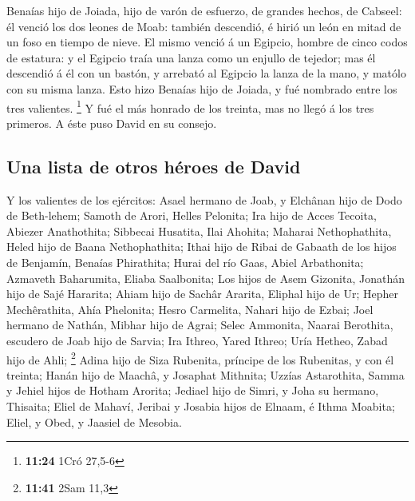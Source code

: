  Benaías hijo de Joiada, hijo de varón de esfuerzo, de
grandes hechos, de Cabseel: él venció los dos leones de Moab: también
descendió, é hirió un león en mitad de un foso en tiempo de nieve.
 El mismo venció á un Egipcio, hombre de cinco codos de
estatura: y el Egipcio traía una lanza como un enjullo de tejedor; mas
él descendió á él con un bastón, y arrebató al Egipcio la lanza de la
mano, y matólo con su misma lanza.  Esto hizo Benaías
hijo de Joiada, y fué nombrado entre los tres valientes. \footnote{\textbf{11:24}
  1Cró 27,5-6}  Y fué el más honrado de los treinta, mas
no llegó á los tres primeros. A éste puso David en su consejo.

\hypertarget{una-lista-de-otros-huxe9roes-de-david}{%
\subsection{Una lista de otros héroes de
David}\label{una-lista-de-otros-huxe9roes-de-david}}

 Y los valientes de los ejércitos: Asael hermano de Joab,
y Elchânan hijo de Dodo de Beth-lehem;  Samoth de Arori,
Helles Pelonita;  Ira hijo de Acces Tecoita, Abiezer
Anathothita;  Sibbecai Husatita, Ilai Ahohita;
 Maharai Nethophathita, Heled hijo de Baana
Nethophathita;  Ithai hijo de Ribai de Gabaath de los
hijos de Benjamín, Benaías Phirathita;  Hurai del río
Gaas, Abiel Arbathonita;  Azmaveth Baharumita, Eliaba
Saalbonita;  Los hijos de Asem Gizonita, Jonathán hijo de
Sajé Hararita;  Ahiam hijo de Sachâr Ararita, Eliphal
hijo de Ur;  Hepher Mechêrathita, Ahía Phelonita;
 Hesro Carmelita, Nahari hijo de Ezbai; 
Joel hermano de Nathán, Mibhar hijo de Agrai;  Selec
Ammonita, Naarai Berothita, escudero de Joab hijo de Sarvia;
 Ira Ithreo, Yared Ithreo;  Uría Hetheo,
Zabad hijo de Ahli; \footnote{\textbf{11:41} 2Sam 11,3} 
Adina hijo de Siza Rubenita, príncipe de los Rubenitas, y con él
treinta;  Hanán hijo de Maachâ, y Josaphat Mithnita;
 Uzzías Astarothita, Samma y Jehiel hijos de Hotham
Arorita;  Jediael hijo de Simri, y Joha su hermano,
Thisaita;  Eliel de Mahaví, Jeribai y Josabia hijos de
Elnaam, é Ithma Moabita;  Eliel, y Obed, y Jaasiel de
Mesobia.

